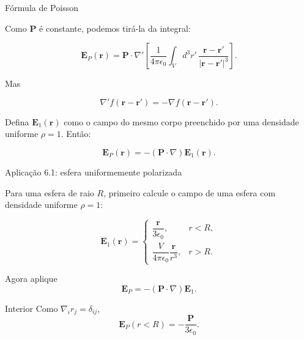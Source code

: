 \documentclass[aspectratio=169]{beamer}
\begin{document}
\begin{frame}{Fórmula de Poisson}

\small

Como \(\mathbf P\) é constante, podemos tirá-la da integral:

\[
\mathbf E_P(\mathbf r)
=
\mathbf P\cdot\nabla'
\left[
\frac{1}{4\pi\epsilon_0}
\int_V d^3r'\,
\frac{\mathbf r-\mathbf r'}{|\mathbf r-\mathbf r'|^3}
\right].
\]

Mas

\[
\nabla' f(\mathbf r-\mathbf r')=-\nabla f(\mathbf r-\mathbf r').
\]

Defina \(\mathbf E_1(\mathbf r)\) como o campo do mesmo corpo preenchido por uma
densidade uniforme \(\rho=1\). Então:

\begin{eqbox}
\begin{equation}
\mathbf E_P(\mathbf r)
=
-(\mathbf P\cdot\nabla)\mathbf E_1(\mathbf r).
\tag{6.15}
\label{eq:poisson-polarizacao}
\end{equation}
\end{eqbox}

\end{frame}

\begin{frame}{Aplicação 6.1: esfera uniformemente polarizada}

\small

Para uma esfera de raio \(R\), primeiro calcule o campo de uma esfera com
densidade uniforme \(\rho=1\):

\begin{eqbox}
\begin{equation}
\mathbf E_1(\mathbf r)
=
\begin{cases}
\dfrac{\mathbf r}{3\epsilon_0}, & r<R,\\[0.25cm]
\dfrac{V}{4\pi\epsilon_0}\dfrac{\mathbf r}{r^3}, & r>R.
\end{cases}
\tag{6.16}
\label{eq:campo-esfera-rho1}
\end{equation}
\end{eqbox}

Agora aplique
\[
\mathbf E_P=-(\mathbf P\cdot\nabla)\mathbf E_1.
\]

\begin{mybox}{Interior}
Como \(\nabla_i r_j=\delta_{ij}\),
\[
\mathbf E_P(r<R)=-\frac{\mathbf P}{3\epsilon_0}.
\]
\end{mybox}

\end{frame}
\end{document}
